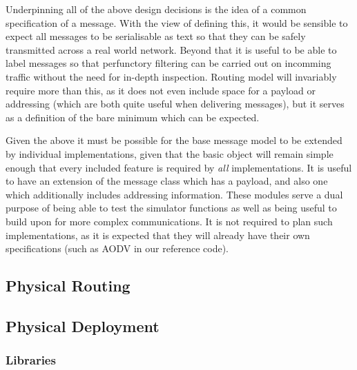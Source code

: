 Underpinning all of the above design decisions is the idea of a common specification of a message. With the view of defining this, it would be sensible to expect all messages to be serialisable as text so that they can be safely transmitted across a real world network. Beyond that it is useful to be able to label messages so that perfunctory filtering can be carried out on incomming traffic without the need for in-depth inspection. Routing model will invariably require more than this, as it does not even include space for a payload or addressing (which are both quite useful when delivering messages), but it serves as a definition of the bare minimum which can be expected. 

Given the above it must be possible for the base message model to be extended by individual implementations, given that the basic object will remain simple enough that every included feature is required by \textit{all} implementations. It is useful to have an extension of the message class which has a payload, and also one which additionally includes addressing information. These modules serve a dual purpose of being able to test the simulator functions as well as being useful to build upon for more complex communications. It is not required to plan such implementations, as it is expected that they will already have their own specifications (such as AODV in our reference code).
		
\subsection{Physical Routing} 
\subsection{Physical Deployment}
\subsubsection{Libraries}
